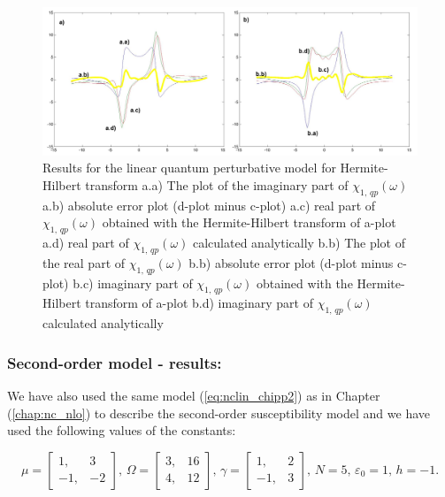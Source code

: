 \documentclass[12pt,twoside,a4paper]{article}
\numberwithin{equation}{subsection}
\numberwithin{figure}{subsection}
\begin{document}
\begin{figure}
  \includegraphics[width=150mm]{img/hht_qp1.png}
  \caption{Results for the linear quantum perturbative model for Hermite-Hilbert transform
    a.a) The plot of the imaginary part of ${\chi_{1, \,qp}}(\omega )$
    a.b) absolute error plot (d-plot minus c-plot) 
    a.c) real part of ${\chi_{1, \, qp}}(\omega )$ obtained with the Hermite-Hilbert transform of a-plot 
    a.d) real part of ${\chi_{1, \, qp}}(\omega )$ calculated analytically 
    b.b) The plot of the real part of ${\chi_{1, \, qp}}(\omega )$ 
    b.b) absolute error plot (d-plot minus c-plot) 
    b.c) imaginary part of ${\chi_{1, \, qp}}(\omega )$ obtained with the Hermite-Hilbert transform of a-plot 
    b.d) imaginary part of ${\chi_{1, \, qp}}(\omega )$ calculated analytically  
    \label{fig:hht_qp1}
  }
\end{figure}

\subsubsection*{Second-order model - results:}

We have also used the same model (\ref{eq:nclin_chipp2}) as in Chapter (\ref{chap:nc_nlo}) to describe the second-order susceptibility model and we have used the following values of the constants: 

\begin{equation}
	\mu = \begin{bmatrix} 
    	1, & 3 \\ -1, & -2 
  	\end{bmatrix} , \, 
  	\Omega =  \begin{bmatrix}  
    	3, & 16 \\ 4, & 12 
  	\end{bmatrix} , \,
  	\gamma =  \begin{bmatrix}  
  		1, & 2 \\ -1, & 3
  	\end{bmatrix} , \, 
  	N = 5 , \, 
  	\varepsilon_0 = 1, \,
  	h = - 1 .
\end{equation}
\end{document}
